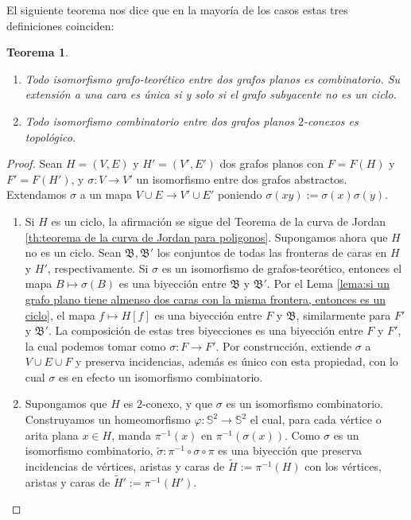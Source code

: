 \documentclass[12pt]{report}
\theoremstyle{plain}
\newtheorem{theorem}{Teorema}[section]
\theoremstyle{definition}
\begin{document}
El siguiente teorema nos dice que en la mayoría de los casos estas tres definiciones coinciden:
\begin{theorem}
\begin{enumerate}
\item Todo isomorfismo grafo-teorético entre dos grafos planos es combinatorio. Su extensión a una cara es única si y solo si el grafo subyacente no es un ciclo.
\item Todo isomorfismo combinatorio entre dos grafos planos $2$-conexos es topológico.
\end{enumerate}
\end{theorem}
\begin{proof}
Sean $H = (V,E)$ y $H' = (V', E')$ dos grafos planos con $F = F(H)$ y $F' = F(H')$, y $\sigma : V \rightarrow V'$ un isomorfismo entre dos grafos abstractos. Extendamos $\sigma$ a un mapa $V \cup E \rightarrow V' \cup E'$ poniendo $\sigma (xy) := \sigma (x) \sigma (y)$.

\begin{enumerate}
\item Si $H$ es un ciclo, la afirmación se sigue del Teorema de la curva de Jordan \ref{th:teorema de la curva de Jordan para poligonos}. Supongamos ahora que $H$ no es un ciclo. Sean $\mathfrak B, \mathfrak B'$ los conjuntos de todas las fronteras de caras en $H$ y $H'$, respectivamente. Si $\sigma$ es un isomorfismo de grafos-teorético, entonces el mapa $B \mapsto \sigma (B)$ es una biyección entre $\mathfrak B$ y $\mathfrak B'$. Por el Lema \ref{lema:si un grafo plano tiene almenso dos caras con la misma frontera, entonces es un ciclo}, el mapa $f \mapsto H[f]$ es una biyección entre $F$ y $\mathfrak B$, similarmente para $F'$ y $\mathfrak B'$. La composición de estas tres biyecciones es una biyección entre $F$ y $F'$, la cual podemos tomar como $\sigma : F \rightarrow F'$. Por construcción, extiende $\sigma$ a $V \cup E \cup F$ y preserva incidencias, además es único con esta propiedad, con lo cual $\sigma$ es en efecto un isomorfismo combinatorio.

\item Supongamos que $H$ es $2$-conexo, y que $\sigma$ es un isomorfismo combinatorio. Construyamos un homeomorfismo $\varphi : \mathbb{S}^2 \rightarrow \mathbb{S}^2$ el cual, para cada vértice o arita plana $x \in H$, manda $\pi^{-1} (x)$ en $\pi^{-1} (\sigma (x))$. Como $\sigma$ es un isomorfismo combinatorio, $\tilde \sigma : \pi^{-1} \circ \sigma \circ \pi$ es una biyección que preserva incidencias de vértices, aristas y caras de $\tilde H := \pi^{-1} (H)$ con los vértices, aristas y caras de $\tilde H ' := \pi^{-1} (H')$.


\end{enumerate}
\end{proof}
\end{document}
